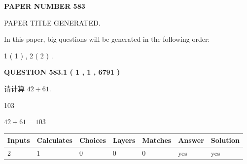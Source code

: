 \documentclass{ctexart}
\begin{document}
   
 {\textbf{ \Large{ PAPER NUMBER  583  }}}
   
   
\vspace{0.2in}
   
   
   
   
   
   
   
   
 \vspace{0.2in}
 
 
 
 
   
   
 PAPER TITLE GENERATED.
   
   
   
\vspace{0.2in}
   
In this paper, big questions will be generated in the following order: 
   
   
   1 ( 1 )
 ,
   2 ( 2 )
 .
  
\vspace{0.2in}
  
{\textbf{\Large{QUESTION
583.1 
 ( 1 , 1 , 6791 )
}}}
  
  
 
请计算 $ %
42 +  %
61 $.
 
 
 
\noindent{}
 
 

103
 
 
\noindent{}
 
 

 
 
 
\noindent{}
 
 

$ %
42 +  %
61=   %
103$
 
 
\noindent{}
 
 

 
   
   
   
   
\noindent\begin{tabular}{|l|l|l|l|l|l|l|}
 \hline
Inputs & Calculates & Choices & Layers & Matches & Answer & Solution \\ \hline
 2  & 
 1  & 
 0
  & 
 0  & 
 0  & 
  yes & 
  yes 
  \\ \hline
 \end{tabular}
   
\end{document}
